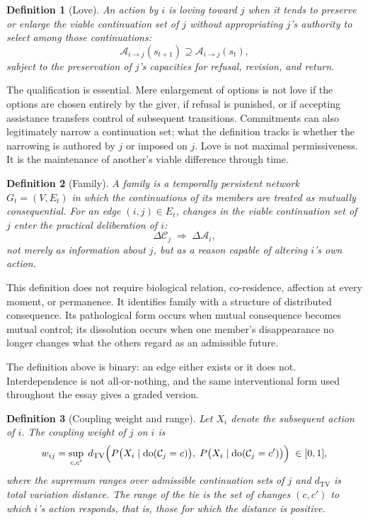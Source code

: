 \documentclass[11pt]{article}
\newtheorem{definition}{Definition}
\theoremstyle{remark}
\begin{document}
\begin{definition}[Love]
An action by $i$ is \emph{loving toward} $j$ when it tends to preserve or enlarge the viable continuation set of $j$ without appropriating $j$'s authority to select among those continuations:
\[
\mathcal{A}_{i\to j}(s_{t+1})
\supseteq
\mathcal{A}_{i\to j}(s_t),
\]
subject to the preservation of $j$'s capacities for refusal, revision, and return.
\end{definition}

The qualification is essential. Mere enlargement of options is not love if the options are chosen entirely by the giver, if refusal is punished, or if accepting assistance transfers control of subsequent transitions. Commitments can also legitimately narrow a continuation set; what the definition tracks is whether the narrowing is authored by $j$ or imposed on $j$. Love is not maximal permissiveness. It is the maintenance of another's viable difference through time.

\begin{definition}[Family]
A \emph{family} is a temporally persistent network $G_t=(V,E_t)$ in which the continuations of its members are treated as mutually consequential. For an edge $(i,j)\in E_t$, changes in the viable continuation set of $j$ enter the practical deliberation of $i$:
\[
\Delta\mathcal{C}_j \;\Rightarrow\; \Delta\mathcal{A}_i,
\]
not merely as information about $j$, but as a reason capable of altering $i$'s own action.
\end{definition}

This definition does not require biological relation, co-residence, affection at every moment, or permanence. It identifies family with a structure of distributed consequence. Its pathological form occurs when mutual consequence becomes mutual control; its dissolution occurs when one member's disappearance no longer changes what the others regard as an admissible future.

The definition above is binary: an edge either exists or it does not. Interdependence is not all-or-nothing, and the same interventional form used throughout the essay gives a graded version.

\begin{definition}[Coupling weight and range]
Let $X_i$ denote the subsequent action of $i$. The \emph{coupling weight} of $j$ on $i$ is
\[
w_{ij}
=
\sup_{c,c'}\;
d_{\mathrm{TV}}\Bigl(
P\bigl(X_i\mid\mathrm{do}(\mathcal{C}_j=c)\bigr),\;
P\bigl(X_i\mid\mathrm{do}(\mathcal{C}_j=c')\bigr)
\Bigr)\;\in[0,1],
\]
where the supremum ranges over admissible continuation sets of $j$ and $d_{\mathrm{TV}}$ is total variation distance. The \emph{range} of the tie is the set of changes $(c,c')$ to which $i$'s action responds, that is, those for which the distance is positive.
\end{definition}
\end{document}
